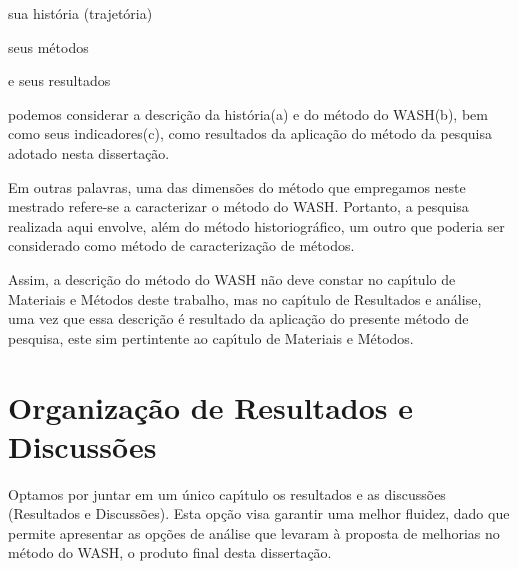 \documentclass[
12pt,		%
openright,	%
twoside,  %
a4paper,			%
chapter=TITLE,		%
english,			%
french,				%
spanish,			%
brazil				%
]{USPSC-classe/USPSC_RedarTex}
\begin{document}
\begin{alineas}
\item sua hist\'oria (trajet\'oria)
\item seus m\'etodos
\item e seus resultados
\end{alineas}

podemos considerar a descri\c{c}\~ao da hist\'oria(a) e do m\'etodo do WASH(b), bem como seus indicadores(c), como resultados da aplica\c{c}\~ao do m\'etodo da pesquisa adotado nesta disserta\c{c}\~ao.










Em outras palavras, uma das dimens\~oes do m\'etodo que empregamos neste mestrado refere-se a caracterizar o m\'etodo do WASH. Portanto, a pesquisa realizada aqui envolve, al\'em do m\'etodo historiogr\'afico, um outro que poderia ser considerado como m\'etodo de caracteriza\c{c}\~ao de m\'etodos.










Assim, a descri\c{c}\~ao do m\'etodo do WASH n\~ao deve constar no cap\'{\i}tulo de Materiais e M\'etodos deste trabalho, mas no cap\'{\i}tulo de Resultados e an\'alise, uma vez que essa descri\c{c}\~ao \'e resultado da aplica\c{c}\~ao do presente m\'etodo de pesquisa, este sim pertintente ao cap\'{\i}tulo de \textquotedbl Materiais e M\'etodos\textquotedbl .










\section[Organiza\c{c}\~ao de Resultados e Discuss\~oes]{Organiza\c{c}\~ao de Resultados e Discuss\~oes}\label{Organiza\c{c}\~ao de Resultados e Discuss\~oes}
Optamos por juntar em um \'unico cap\'{\i}tulo os resultados e as discuss\~oes (\textquotedbl Resultados e Discuss\~oes\textquotedbl ). Esta op\c{c}\~ao visa garantir uma melhor fluidez, dado que permite apresentar as op\c{c}\~oes de an\'alise que levaram \`a proposta de melhorias no m\'etodo do WASH, o produto final desta disserta\c{c}\~ao.
\end{document}
